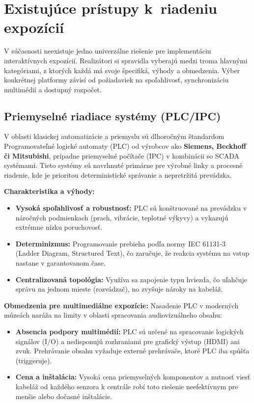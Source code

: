 \section{Existujúce prístupy k~riadeniu expozícií}
\label{existujuce-pristupy}

V súčasnosti neexistuje jedno univerzálne riešenie pre implementáciu interaktívnych expozícií. Realizátori si spravidla vyberajú medzi troma hlavnými kategóriami, z ktorých každá má svoje špecifiká, výhody a obmedzenia. Výber konkrétnej platformy závisí od požiadaviek na spoľahlivosť, synchronizáciu multimédií a dostupný rozpočet.

\subsection{Priemyselné riadiace systémy (PLC/IPC)}
\label{plc-systemy}
V oblasti klasickej automatizácie a priemyslu sú dlhoročným štandardom Programovateľné logické automaty (PLC) od výrobcov ako \textbf{Siemens, Beckhoff či Mitsubishi}, prípadne priemyselné počítače (IPC) v kombinácii so SCADA systémami. Tieto systémy sú navrhnuté primárne pre výrobné linky a procesné riadenie, kde je prioritou deterministické správanie a nepretržitá prevádzka.

\textbf{Charakteristika a výhody:}
\begin{itemize}
    \item \textbf{Vysoká spoľahlivosť a robustnosť:} PLC sú konštruované na prevádzku v náročných podmienkach (prach, vibrácie, teplotné výkyvy) a vykazujú extrémne nízku poruchovosť.
    \item \textbf{Determinizmus:} Programovanie prebieha podľa normy IEC 61131-3 (Ladder Diagram, Structured Text), čo zaručuje, že reakcia systému na vstup nastane v garantovanom čase.
    \item \textbf{Centralizovaná topológia:} Využíva sa zapojenie typu hviezda, čo uľahčuje správu na jednom mieste (rozvádzač), no zvyšuje nároky na kabeláž.
\end{itemize}

\textbf{Obmedzenia pre multimediálne expozície:}
Nasadenie PLC v moderných múzeách naráža na limity v oblasti spracovania audiovizuálneho obsahu:
\begin{itemize}
    \item \textbf{Absencia podpory multimédií:} PLC sú určené na spracovanie logických signálov (I/O) a nedisponujú rozhraniami pre grafický výstup (HDMI) ani zvuk. Prehrávanie obsahu vyžaduje externé prehrávače, ktoré PLC iba spúšťa (triggeruje).

    \item \textbf{Cena a inštalácia:} Vysoká cena priemyselných komponentov a nutnosť viesť kabeláž od každého senzora k centrále robí toto riešenie neefektívnym pre menšie alebo dočasné inštalácie.
\end{itemize}

